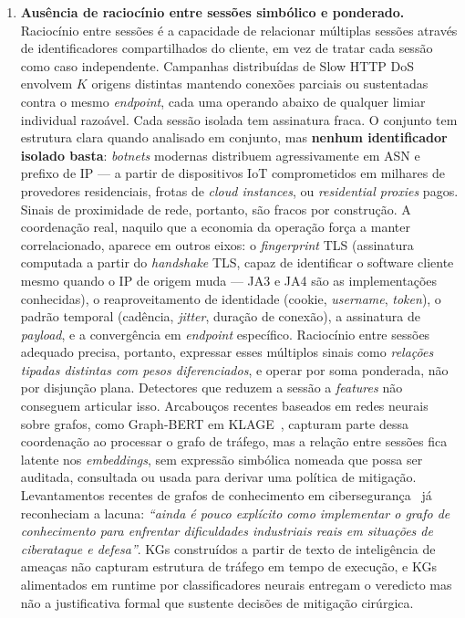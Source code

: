 \documentclass[preprint,12pt]{elsarticle}
\begin{document}
\begin{enumerate}
    \item \textbf{Ausência de raciocínio entre sessões simbólico e ponderado.} Raciocínio entre sessões é a capacidade de relacionar múltiplas sessões através de identificadores compartilhados do cliente, em vez de tratar cada sessão como caso independente. Campanhas distribuídas de Slow HTTP DoS envolvem $K$ origens distintas mantendo conexões parciais ou sustentadas contra o mesmo \emph{endpoint}, cada uma operando abaixo de qualquer limiar individual razoável. Cada sessão isolada tem assinatura fraca. O conjunto tem estrutura clara quando analisado em conjunto, mas \textbf{nenhum identificador isolado basta}: \emph{botnets} modernas distribuem agressivamente em ASN e prefixo de IP --- a partir de dispositivos IoT comprometidos em milhares de provedores residenciais, frotas de \emph{cloud instances}, ou \emph{residential proxies} pagos. Sinais de proximidade de rede, portanto, são fracos por construção. A coordenação real, naquilo que a economia da operação força a manter correlacionado, aparece em outros eixos: o \emph{fingerprint} TLS (assinatura computada a partir do \emph{handshake} TLS, capaz de identificar o software cliente mesmo quando o IP de origem muda --- JA3 e JA4 são as implementações conhecidas), o reaproveitamento de identidade (cookie, \emph{username}, \emph{token}), o padrão temporal (cadência, \emph{jitter}, duração de conexão), a assinatura de \emph{payload}, e a convergência em \emph{endpoint} específico. Raciocínio entre sessões adequado precisa, portanto, expressar esses múltiplos sinais como \emph{relações tipadas distintas com pesos diferenciados}, e operar por soma ponderada, não por disjunção plana. Detectores que reduzem a sessão a \emph{features} não conseguem articular isso. Arcabouços recentes baseados em redes neurais sobre grafos, como Graph-BERT em KLAGE~\cite{belcastro2025klage}, capturam parte dessa coordenação ao processar o grafo de tráfego, mas a relação entre sessões fica latente nos \emph{embeddings}, sem expressão simbólica nomeada que possa ser auditada, consultada ou usada para derivar uma política de mitigação. Levantamentos recentes de grafos de conhecimento em cibersegurança~\cite{liu2022recent} já reconheciam a lacuna: \emph{``ainda é pouco explícito como implementar o grafo de conhecimento para enfrentar dificuldades industriais reais em situações de ciberataque e defesa''}. KGs construídos a partir de texto de inteligência de ameaças não capturam estrutura de tráfego em tempo de execução, e KGs alimentados em runtime por classificadores neurais entregam o veredicto mas não a justificativa formal que sustente decisões de mitigação cirúrgica.
\end{enumerate}
\end{document}
